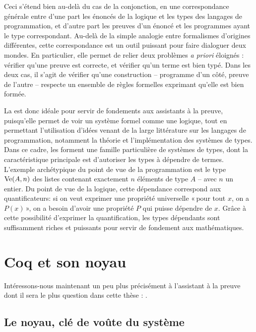 Ceci s’étend bien au-delà du cas de la conjonction,
en une correspondance générale entre d’une part les énoncés de la logique et les types des langages de programmation, et d’autre part les preuves d’un énoncé et les programmes ayant le type correspondant.
Au-delà de la simple analogie entre formalismes d’origines différentes, cette correspondance est un outil puissant pour faire dialoguer deux mondes.
En particulier, elle permet de relier deux problèmes \textit{a priori} éloignés :
vérifier qu’une preuve est correcte, et vérifier qu’un terme est bien typé.
Dans les deux cas, il s’agit de vérifier qu’une construction – programme d’un côté,
preuve de l’autre – respecte un ensemble de règles formelles exprimant qu’elle est
bien formée.

La  est donc idéale pour servir de fondements aux
assistants à la preuve, puisqu’elle permet de voir un système formel
comme une logique, tout en permettant l’utilisation d’idées venant de
la large littérature sur les langages de programmation, notamment
la théorie et l’implémentation des systèmes de types.
Dans ce cadre, les  
forment une famille particulière de systèmes de types, dont la
caractéristique principale est d’autoriser les types à dépendre de termes.
L’exemple archétypique du point de vue de la  programmation est le type
$\operatorname{Ve}(A,n)$ des listes contenant exactement $n$ éléments
de type $A$ – avec $n$ un entier.
Du point de vue de la logique, cette
dépendance correspond aux quantificateurs: si on veut exprimer
une propriété universelle « pour tout $x$, on a $P(x)$ », on a besoin d’avoir une propriété
$P$ qui puisse dépendre de $x$.
Grâce à cette possibilité d’exprimer la quantification,
les types dépendants sont suffisamment riches et puissants pour
servir de fondement aux mathématiques.

\section{Coq et son noyau}
\label{sec:intro-coq}

Intéressons-nous maintenant un peu plus précisément à l’assistant à la
preuve dont il sera le plus question dans cette thèse : .

\subsection[Le noyau]{Le noyau, clé de voûte du système}

